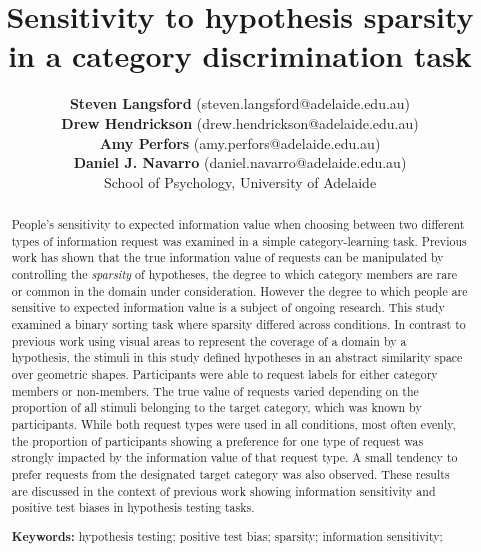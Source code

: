\documentclass[10pt,letterpaper]{article}
\title{Sensitivity to hypothesis sparsity in a category discrimination task}
\author{{\bf Steven Langsford} (steven.langsford@adelaide.edu.au) \\
   	{\bf Drew Hendrickson} (drew.hendrickson@adelaide.edu.au) \\
	{\bf Amy Perfors} (amy.perfors@adelaide.edu.au) \\
   	{\bf Daniel J. Navarro} (daniel.navarro@adelaide.edu.au) \\
   School of Psychology, University of Adelaide}
\begin{document}
\maketitle

\begin{abstract}
People's sensitivity to expected information value when choosing between two different types of information request was examined in a simple category-learning task. Previous work has shown that the true information value of requests can be manipulated by controlling the \textit{sparsity} of hypotheses, the degree to which category members are rare or common in the domain under consideration. However the degree to which people are sensitive to expected information value is a subject of ongoing research. This study examined a binary sorting task where sparsity differed across conditions. In contrast to previous work using visual areas to represent the coverage of a domain by a hypothesis, the stimuli in this study defined hypotheses in an abstract similarity space over geometric shapes. Participants were able to request labels for either category members or non-members. The true value of requests varied depending on the proportion of all stimuli belonging to the target category, which was known by participants. While both request types were used in all conditions, most often evenly, the proportion of participants showing a preference for one type of request was strongly impacted by the information value of that request type. A small tendency to prefer requests from the designated target category was also observed. These results are discussed in the context of previous work showing information sensitivity and positive test biases in hypothesis testing tasks.

\textbf{Keywords:} 
hypothesis testing; positive test bias; sparsity; information sensitivity;
\end{abstract}
\end{document}
